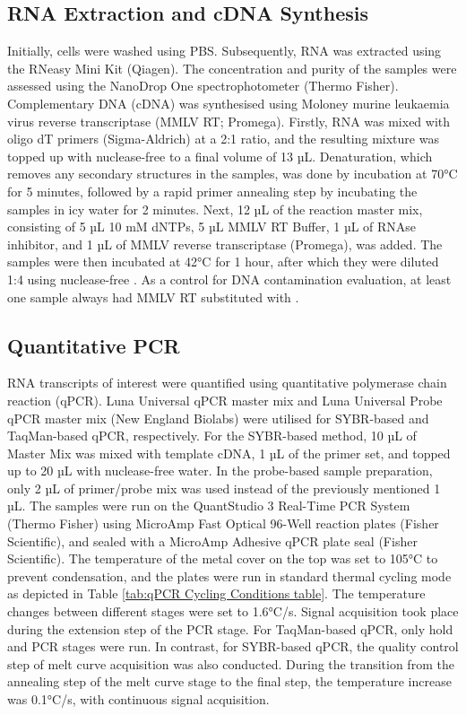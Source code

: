 \subsection{RNA Extraction and cDNA Synthesis} \label{subsec:RNA Extraction and cDNA Synthesis}
Initially, cells were washed using PBS. Subsequently, RNA was extracted using the RNeasy Mini Kit (Qiagen). The concentration and purity of the samples were assessed using the NanoDrop One spectrophotometer (Thermo Fisher). Complementary DNA (cDNA) was synthesised using Moloney murine leukaemia virus reverse transcriptase (MMLV RT; Promega). Firstly, RNA was mixed with oligo dT primers (Sigma-Aldrich) at a 2:1 ratio, and the resulting mixture was topped up with nuclease-free  to a final volume of 13 µL. Denaturation, which removes any secondary structures in the samples, was done by incubation at 70°C for 5 minutes, followed by a rapid primer annealing step by incubating the samples in icy water for 2 minutes. Next, 12 µL of the reaction master mix, consisting of 5 µL 10 mM dNTPs, 5 µL MMLV RT Buffer, 1 µL of RNAse inhibitor, and 1 µL of MMLV reverse transcriptase (Promega), was added. The samples were then incubated at 42°C for 1 hour, after which they were diluted 1:4 using nuclease-free . As a control for DNA contamination evaluation, at least one sample always had MMLV RT substituted with .

\subsection{Quantitative PCR} \label{subsec:Quantitative PCR}
RNA transcripts of interest were quantified using quantitative polymerase chain reaction (qPCR). Luna Universal qPCR master mix and Luna Universal Probe qPCR master mix (New England Biolabs) were utilised for SYBR-based and TaqMan-based qPCR, respectively. For the SYBR-based method, 10 µL of Master Mix was mixed with template cDNA, 1 µL of the primer set, and topped up to 20 µL with nuclease-free water. In the probe-based sample preparation, only 2 µL of primer/probe mix was used instead of the previously mentioned 1 µL. The samples were run on the QuantStudio 3 Real-Time PCR System (Thermo Fisher) using MicroAmp Fast Optical 96-Well reaction plates (Fisher Scientific), and sealed with a MicroAmp Adhesive qPCR plate seal (Fisher Scientific). The temperature of the metal cover on the top was set to 105°C to prevent condensation, and the plates were run in standard thermal cycling mode as depicted in Table \ref{tab:qPCR Cycling Conditions table}. The temperature changes between different stages were set to 1.6°C/s. Signal acquisition took place during the extension step of the PCR stage. For TaqMan-based qPCR, only hold and PCR stages were run. In contrast, for SYBR-based qPCR, the quality control step of melt curve acquisition was also conducted. During the transition from the annealing step of the melt curve stage to the final step, the temperature increase was 0.1°C/s, with continuous signal acquisition.

